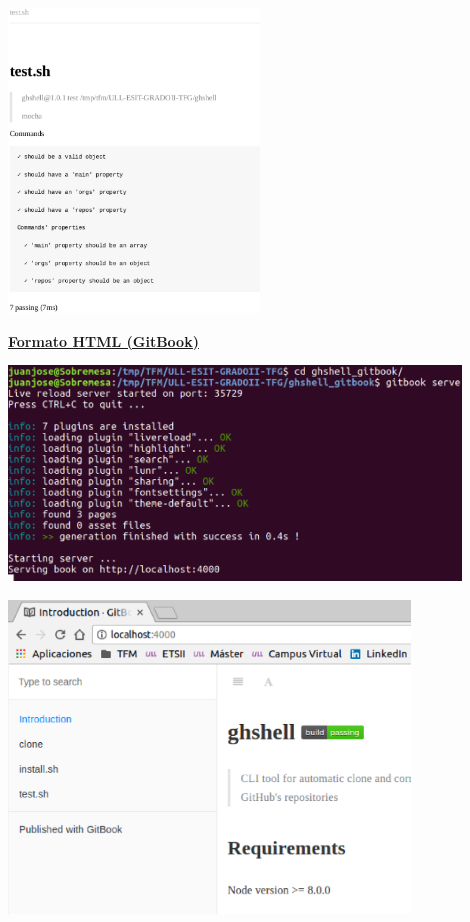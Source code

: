 \documentclass{beamer}
\begin{document}
\begin{frame}[allowframebreaks]
\begin{center}
  	\includegraphics[width=0.5\textwidth]{images/ghshell8-4.eps}
  	\framebreak

  \end{center}
  
  \underline{{\bfseries Formato HTML (GitBook)}}
  	
  \begin{center}
  	\includegraphics[width=0.9\textwidth]{images/ghshell8-5.eps}
  	\framebreak
  	
  	\includegraphics[width=0.8\textwidth]{images/ghshell8-3.eps}

  \end{center}
  
\end{frame}
  
\end{document}
